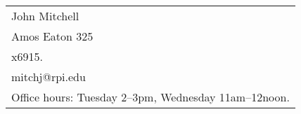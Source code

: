 \documentclass[12pt]{article}
\begin{document}
\begin{enumerate}
\end{enumerate}

\vfill

\begin{tabular}{@{\hspace{.5in}}l}
   John Mitchell  \\
   Amos Eaton 325  \\
   x6915.  \\
   mitchj@rpi.edu  \\
   Office hours:
   Tuesday 2--3pm, Wednesday 11am--12noon.
\end{tabular}
\end{document}
